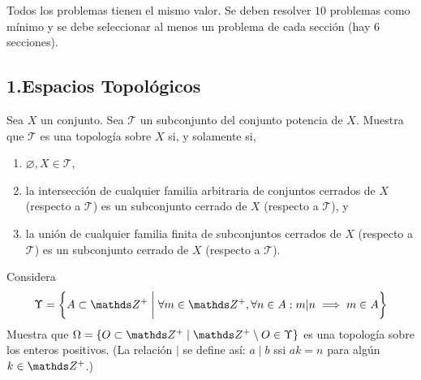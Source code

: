 \documentclass[b5paper,10pt,twoside]{book}
\begin{document}
\def\thetitle{Examen final}
\def\fechaentrega{31 de enero de 2025}


Todos los problemas tienen el mismo valor. Se deben resolver \(10\) problemas como mínimo y se debe seleccionar al menos un problema de cada sección (hay 6 secciones).



\subsection*{1.\enspace Espacios Topológicos}

\begin{problem}
Sea \(X\) un conjunto.
Sea \(\mathcal{T}\) un subconjunto del conjunto potencia de \(X\).
Muestra que \(\mathcal{T}\) es una topología sobre \(X\) si, y solamente si,
\begin{enumerate}[label=(\roman*)]
\item \(\varnothing, X\in \mathcal{T}\),
\item la intersección de cualquier familia arbitraria de conjuntos cerrados de \(X\) (respecto a \(\mathcal{T}\)) es un subconjunto cerrado de \(X\) (respecto a \(\mathcal{T}\)), y 
\item la unión de cualquier familia finita de subconjuntos cerrados de \(X\) (respecto a \(\mathcal{T}\)) es un subconjunto cerrado de \(X\) (respecto a \(\mathcal{T}\)).
\end{enumerate}
\end{problem}


\begin{problem}
Considera 
\[
\Upsilon  = \left\{ 
    A\subset \Z^+ \;\bigg|\; \forall m \in \Z^+, \forall n \in A :  m|n \implies m \in A
 \right\}
\]
Muestra que \( \Omega = \left\{ O \subset \Z^+ \mid \Z^+\setminus O \in \Upsilon \right\}  \) es una topología sobre los enteros positivos.
(La relación \(\mid\) se define así:  \(a\mid b\) ssi \(ak = n\) para algún   \(k\in \Z^+\).)
\end{problem}
\end{document}
